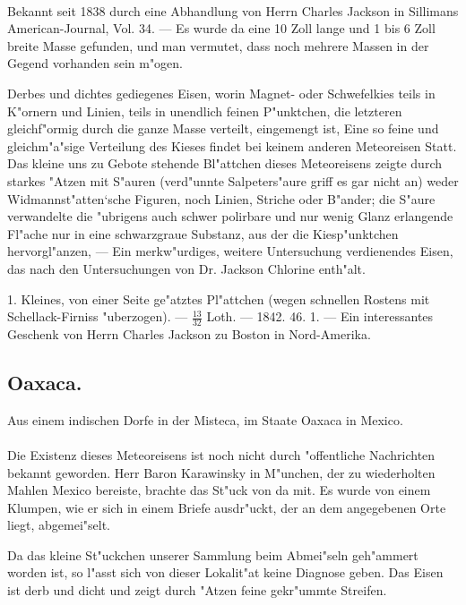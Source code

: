 \documentclass[a4paper, 11pt, oneside, polutonikogreek, german]{article}
\begin{document}
\paragraph{}
Bekannt seit 1838 durch eine Abhandlung von Herrn Charles Jackson in Sillimans American-Journal, Vol. 34. --- Es wurde da eine 10 Zoll lange und 1 bis 6 Zoll breite Masse gefunden, und man vermutet, dass noch mehrere Massen in der Gegend vorhanden sein m"ogen.

Derbes und dichtes gediegenes Eisen, worin Magnet- oder Schwefelkies teils in K"ornern und Linien, teils in unendlich feinen P"unktchen, die letzteren gleichf"ormig durch die ganze Masse verteilt, eingemengt ist, Eine so feine und gleichm"a"sige Verteilung des Kieses findet bei keinem anderen Meteoreisen Statt. Das kleine uns zu Gebote stehende Bl"attchen dieses Meteoreisens zeigte durch starkes "Atzen mit S"auren (verd"unnte Salpeters"aure griff es gar nicht an) weder Widmannst"atten‘sche Figuren, noch Linien, Striche oder B"ander; die S"aure verwandelte die "ubrigens auch schwer polirbare und nur wenig Glanz erlangende Fl"ache nur in eine schwarzgraue Substanz, aus der die Kiesp"unktchen hervorgl"anzen, --- Ein merkw"urdiges, weitere Untersuchung verdienendes Eisen, das nach den Untersuchungen von Dr. Jackson Chlorine enth"alt.

1. Kleines, von einer Seite ge"atztes Pl"attchen (wegen schnellen Rostens mit Schellack-Firniss "uberzogen). --- $\frac{13}{32}$ Loth. --- 1842. 46. 1. --- Ein interessantes Geschenk von Herrn Charles Jackson zu Boston in Nord-Amerika.
\subsection{Oaxaca.}
\begin{center}
\small
Aus einem indischen Dorfe in der Misteca, im Staate Oaxaca in Mexico.
\end{center}
\paragraph{}
Die Existenz dieses Meteoreisens ist noch nicht durch "offentliche Nachrichten bekannt geworden. Herr Baron Karawinsky in M"unchen, der zu wiederholten Mahlen Mexico bereiste, brachte das St"uck von da mit. Es wurde von einem Klumpen, wie er sich in einem Briefe ausdr"uckt, der an dem angegebenen Orte liegt, abgemei"selt.

Da das kleine St"uckchen unserer Sammlung beim Abmei"seln geh"ammert worden ist, so l"asst sich von dieser Lokalit"at keine Diagnose geben. Das Eisen ist derb und dicht und zeigt durch "Atzen feine gekr"ummte Streifen.
\end{document}
